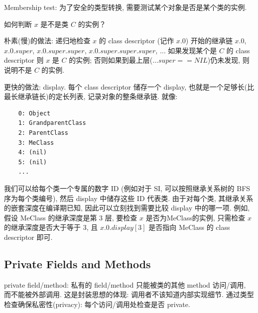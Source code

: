 Membership test: 为了安全的类型转换, 需要测试某个对象是否是某个类的实例. 

如何判断 $x$ 是不是类 $C$ 的实例？

朴素(慢)的做法: 递归地检查 $x$ 的 class descriptor (记作 $x.0$) 开始的继承链 $x.0$, $x.0.super$, $x.0.super.super$, $x.0.super.super.super$, $\dots$ 如果发现某个是 $C$ 的 class descriptor 则 $x$ 是 $C$ 的实例; 否则如果到最上层($\dots super==NIL$)仍未发现, 则说明不是 $C$ 的实例. 

更快的做法: display. 每个 class descriptor 储存一个 display, 也就是一个足够长(比最长继承链长)的定长列表, 记录对象的整条继承链. 就像: 
\begin{verbatim}
    0: Object
    1: GrandparentClass
    2: ParentClass
    3: MeClass
    4: (nil)
    5: (nil)
    ...
\end{verbatim}
我们可以给每个类一个专属的数字 ID (例如对于 SI, 可以按照继承关系树的 BFS 序为每个类编号), 然后 display 中储存这些 ID 代表类. 由于对每个类, 其继承关系的嵌套深度在编译期已知, 因此可以立刻找到需要比较 display 中的哪一项. 例如, 假设 MeClass 的继承深度是第 3 层, 要检查 $x$ 是否为MeClass的实例, 只需检查 $x$ 的继承深度是否大于等于 3, 且 $x.0.display[3]$ 是否指向 MeClass 的 class descriptor 即可. 


\subsection{Private Fields and Methods}
private field/method: 私有的 field/method 只能被类的其他 method 访问/调用, 而不能被外部调用. 这是封装思想的体现: 调用者不该知道内部实现细节. 
通过类型检查确保私密性(privacy): 每个访问/调用处检查是否 private.
